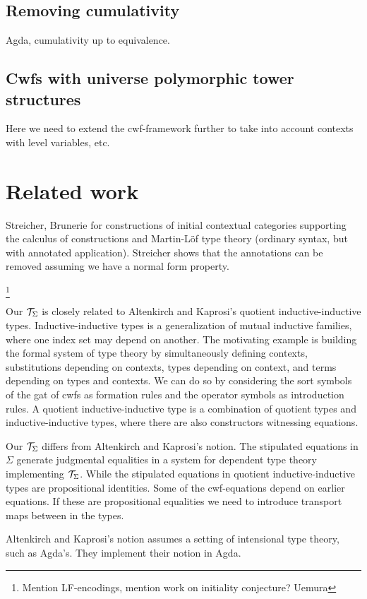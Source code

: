 \documentclass{lmcs}
\begin{document}
\subsection{Removing cumulativity} Agda, cumulativity up to equivalence.

\subsection{Cwfs with universe polymorphic tower structures} Here we need to extend the cwf-framework further to take into account contexts with level variables, etc.

\section{Related work}

Streicher, Brunerie for constructions of initial contextual categories supporting the calculus of constructions and Martin-Löf type theory (ordinary syntax, but with annotated application). Streicher shows that the annotations can be removed assuming we have a normal form property.

\footnote{Mention LF-encodings, mention work on initiality conjecture? Uemura}

Our ${\mathcal T}_\Sigma$ is closely related to Altenkirch and Kaprosi's quotient inductive-inductive types. Inductive-inductive types \cite{nordvallforsberg:phd} is a generalization of mutual inductive families, where one index set may depend on another. The motivating example is building the formal system of type theory by simultaneously defining contexts, substitutions depending on contexts, types depending on context, and terms depending on types and contexts. We can do so by considering the sort symbols of the gat of cwfs as formation rules and the operator symbols as introduction rules. A quotient inductive-inductive type is a combination of quotient types and inductive-inductive types, where there are also constructors witnessing equations. 

Our ${\mathcal T}_\Sigma$ differs from Altenkirch and Kaprosi's notion. The stipulated equations in $\Sigma$ generate judgmental equalities in a system for dependent type theory implementing ${\mathcal T}_\Sigma$. While the stipulated equations in quotient inductive-inductive types are propositional identities. Some of the cwf-equations depend on earlier equations. If these are propositional equalities we need to introduce transport maps between in the types. 

Altenkirch and Kaprosi's notion assumes a setting of intensional type theory, such as Agda's. They implement their notion in Agda.
\end{document}
